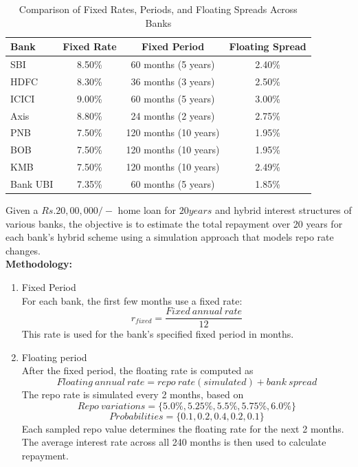 \begin{itemize}
\begin{table}[h]
    \centering
    \begin{tabular}{lccc}
        \toprule
        \textbf{Bank} & \textbf{Fixed Rate} & \textbf{Fixed Period} & \textbf{Floating Spread} \\
        \midrule
        SBI       & 8.50\% & 60 months (5 years)   & 2.40\% \\
        HDFC      & 8.30\% & 36 months (3 years)   & 2.50\% \\
        ICICI     & 9.00\% & 60 months (5 years)   & 3.00\% \\
        Axis      & 8.80\% & 24 months (2 years)   & 2.75\% \\
        PNB       & 7.50\% & 120 months (10 years) & 1.95\% \\
        BOB       & 7.50\% & 120 months (10 years) & 1.95\% \\
        KMB       & 7.50\% & 120 months (10 years) & 2.49\% \\
        Bank UBI  & 7.35\% & 60 months (5 years)   & 1.85\% \\
        \bottomrule
    \end{tabular}
    \caption{Comparison of Fixed Rates, Periods, and Floating Spreads Across Banks}
    \label{tab:fixed-floating-comparison}
\end{table}

Given a $Rs.20,00,000/-$ home loan for $20 years$ and hybrid interest structures of various banks, the objective is to estimate the total repayment over 20 years for each bank's hybrid scheme using a simulation approach that models repo rate changes.\\

\textbf{Methodology:}\\
\begin{enumerate}
    \item Fixed Period\\
    For each bank, the first few months use a fixed rate:
    \[
    r_{fixed} = \frac{Fixed\ annual\ rate}{12}
    \]
    This rate is used for the bank's specified fixed period in months.

    \item Floating period\\
    After the fixed period, the floating rate is computed as
    \[
    Floating\ annual\ rate = repo\ rate (simulated) + bank\ spread
    \]
    The repo rate is simulated every 2 months, based on
    \[
    Repo\ variations = \{5.0\%,5.25\%,5.5\%,5.75\%,6.0\%\}
    \]
    \[
    Probabilities = \{0.1,0.2,0.4,0.2,0.1\}
    \]
    Each sampled repo value determines the floating rate for the next 2 months. The average interest rate across all 240 months is then used to calculate repayment.


\end{enumerate}
\end{itemize}
